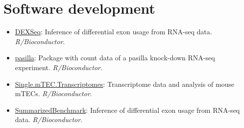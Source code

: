 \documentclass[11pt,a4paper,sans]{moderncv} %
\begin{document}
\section{Software development}
\vspace{-.1cm}
\begin{itemize}
\item \href{http://www.bioconductor.org/packages/release/bioc/html/DEXSeq.html}{DEXSeq}: Inference of differential exon usage from RNA-seq data. \textit{R/Bioconductor}.
\item \href{http://bioconductor.org/packages/release/data/experiment/html/pasilla.html}{pasilla}: Package with count data of a pasilla knock-down RNA-seq experiment. \textit{R/Bioconductor}.
\item \href{http://bioconductor.org/packages/release/data/experiment/html/Single.mTEC.Transcriptomes.html}{Single.mTEC.Transcriptomes}: Transcriptome data and analysis of mouse mTECs. \textit{R/Bioconductor}.
\item \href{http://www.bioconductor.org/packages/release/bioc/html/SummarizedBenchmark.html}{SummarizedBenchmark}: Inference of differential exon usage from RNA-seq data. \textit{R/Bioconductor}.
\end{itemize}
\vspace{-.2cm}
\end{document}
